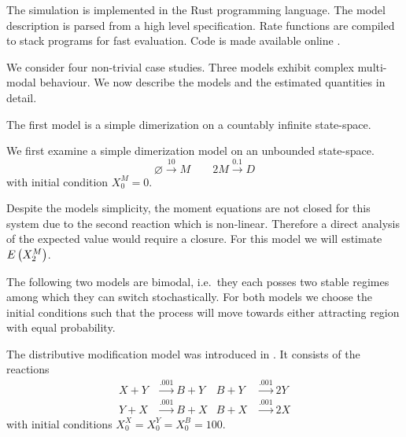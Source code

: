 The simulation is implemented in the Rust programming language.
The model description is parsed from a high level specification. 
Rate functions are compiled to stack programs for fast evaluation.
Code is made available online \cite{cme-simulation-github}.

We consider four non-trivial case studies. Three models exhibit complex multi-modal behaviour.
We now describe the models and the estimated quantities in detail.

The first model is a simple dimerization on a countably infinite state-space.
\begin{model*}[Dimerization]
We first examine a simple dimerization model on an unbounded state-space.
	\[\varnothing\xrightarrow{10}M\qquad 2M\xrightarrow{0.1}D\]
with initial condition $X_0^M=0$.
\end{model*}
Despite the models simplicity, the moment equations are not closed for this system
due to the second reaction which is non-linear.
Therefore a direct analysis of the expected value would require a closure.
For this model we will estimate ${E}\left(X^M_2\right)$.

The following two models are bimodal, i.e.\ they each posses two stable regimes
among which they can switch stochastically.
For both models we choose the initial conditions such that the process
will move towards either attracting region with equal probability.
\begin{model}\label{model:dm}
The distributive modification model was introduced in \citet{cardelli2012cell}.
It consists of the reactions
\begin{align*}
	X + Y &\xrightarrow{\num{.001}} B + Y &
	B + Y &\xrightarrow{\num{.001}} 2 Y\\
	Y + X &\xrightarrow{\num{.001}} B + X &
	B + X &\xrightarrow{\num{.001}} 2 X
\end{align*}
with initial conditions $X^X_0=X^Y_0=X^B_0=100$.
\end{model}


